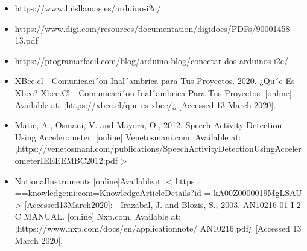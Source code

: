 \documentclass[conference]{IEEEtran}
\begin{document}
\begin{thebibliography}{00}
\begin{itemize}
\item https://www.luisllamas.es/arduino-i2c/
\item https://www.digi.com/resources/documentation/digidocs/PDFs/90001458-13.pdf
\item https://programarfacil.com/blog/arduino-blog/conectar-dos-arduinos-i2c/
\item XBee.cl - Comunicaci´on Inal´ambrica para Tus Proyectos. 2020.
¿Qu´e Es Xbee? Xbee.Cl - Comunicaci´on Inal´ambrica Para Tus
Proyectos. [online] Available at: ¡https://xbee.cl/que-es-xbee/¿ [Accessed
13 March 2020].

\item Matic, A., Osmani, V. and Mayora, O., 2012.
Speech Activity Detection Using Accelerometer.
[online] Venetosmani.com. Available at:
¡https://venetosmani.com/publications/SpeechActivityDetectionUsingAccelerometerIEEEEMBC2012:pdf >

\item NationalInstruments:[online]Availableat :< https :
==knowledge:ni:com=KnowledgeArticleDetails?id =
kA00Z0000019MgLSAU > [Accessed13March2020]:
 Irazabal, J. and Blozis, S., 2003. AN10216-01 I 2 C MANUAL.
[online] Nxp.com. Available at: ¡https://www.nxp.com/docs/en/applicationnote/
AN10216.pdf¿ [Accessed 13 March 2020].

\end{itemize}

\end{thebibliography}
\end{document}
